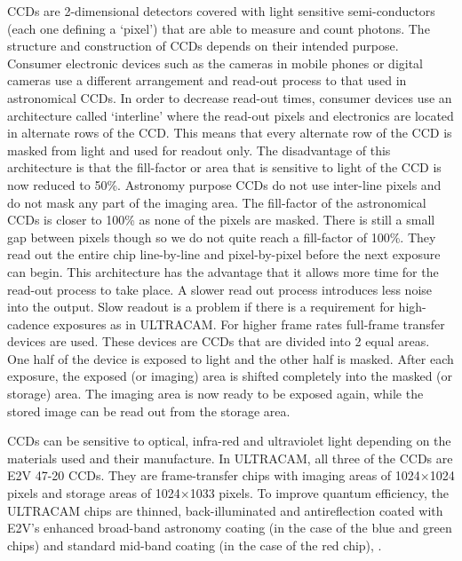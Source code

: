 CCDs are 2-dimensional detectors covered with light sensitive semi-conductors (each one defining a `pixel') that are able to measure and count photons. The structure and construction of CCDs depends on their intended purpose. Consumer electronic devices such as the cameras in mobile phones or digital cameras use a different arrangement and read-out process to that used in astronomical CCDs. In order to decrease read-out times, consumer devices use an architecture called `interline' where the read-out pixels and electronics are located in alternate rows of the CCD. This means that every alternate row of the CCD is masked from light and used for readout only. The disadvantage of this architecture is that the fill-factor or area that is sensitive to light of the CCD is now reduced to 50\%. Astronomy purpose CCDs do not use inter-line pixels and do not mask any part of the imaging area.  The fill-factor of the astronomical CCDs is closer to 100\% as none of the pixels are masked. There is still a small gap between pixels though so we do not quite reach a fill-factor of 100\%. They read out the entire chip line-by-line and pixel-by-pixel before the next exposure can begin. This architecture has the advantage that it allows more time for the read-out process to take place. A slower read out process introduces less noise into the output. Slow readout is a problem if there is a requirement for high-cadence exposures as in ULTRACAM. For higher frame rates full-frame transfer devices are used. These devices are CCDs that are divided into 2 equal areas. One half of the device is exposed to light and the other half is masked. After each exposure, the exposed (or imaging) area is shifted completely into the masked (or storage) area. The imaging area is now ready to be exposed again, while the stored image can be read out from the storage area.  

CCDs can be sensitive to optical, infra-red and ultraviolet light depending on the materials used and their manufacture. In ULTRACAM, all three of the CCDs are E2V 47-20 CCDs. They are frame-transfer chips with imaging areas of 1024$\times$1024 pixels and storage areas of 1024$\times$1033 pixels.  To improve quantum efficiency, the ULTRACAM chips are thinned, back-illuminated and antireflection coated with E2V's enhanced broad-band astronomy coating (in the case of the blue and green chips) and standard mid-band coating (in the case of the red chip), \citep{dhillon07}.

